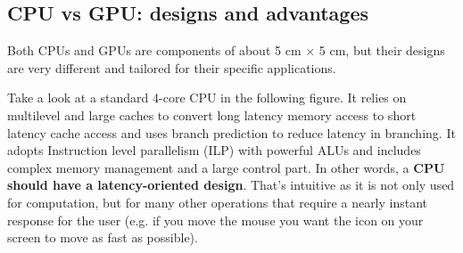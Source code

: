\begin{table}[H]
\centering
{}
\end{table}

\subsection{CPU vs GPU: designs and advantages}

Both CPUs and GPUs are components of about 5 cm $\times$ 5 cm, but their designs are very different and tailored for their specific applications. 

Take a look at a standard 4-core CPU in the following figure. It relies on multilevel and large caches to convert long latency memory access to short latency cache access and uses branch prediction to reduce latency in branching. It adopts Instruction level parallelism (ILP) with powerful ALUs and includes complex memory management and a large control part. In other words, a \textbf{CPU should have a latency-oriented design}. That's intuitive as it is not only used for computation, but for many other operations that require a nearly instant response for the user (e.g. if you move the mouse you want the icon on your screen to move as fast as possible). 


